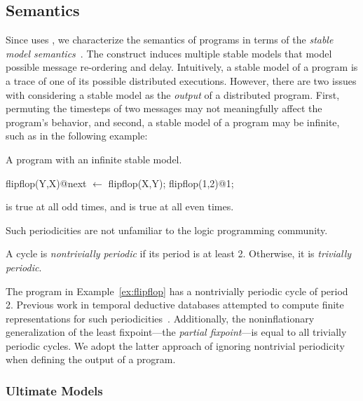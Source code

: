 
\subsection{Semantics}
Since \lang uses , we characterize the semantics of \lang programs in terms of the {\em stable model semantics}~\cite{stable-model}.  The  construct induces multiple stable models that model possible message re-ordering and delay.  Intuitively, a stable model of a \lang program is a trace of one of its possible distributed executions.  However, there are two issues with considering a stable model as the {\em output} of a distributed program.  First, permuting the timesteps of two messages may not meaningfully affect the program's behavior, and second, a stable model of a \lang program may be infinite, such as in the following example:

\begin{example}
\label{ex:flipflop}
A \lang program with an infinite stable model.

\begin{Dedalus}
flipflop(Y,X)@next \(\leftarrow\) flipflop(X,Y);
flipflop(1,2)@1;
\end{Dedalus}

 is true at all odd times, and  is true at all even times.
\end{example}

Such periodicities are not unfamiliar to the logic programming community.  

\begin{definition}
A cycle is {\em nontrivially periodic} if its period is at least 2.  Otherwise, it is {\em trivially periodic}.
\end{definition}

The program in Example~\ref{ex:flipflop} has a nontrivially periodic cycle of period 2.  Previous work in temporal deductive databases attempted to compute finite representations for such periodicities~\cite{tdd-infinite}.  Additionally, the noninflationary generalization of the least fixpoint---the {\em partial fixpoint}---is equal to all trivially periodic cycles.  We adopt the latter approach of ignoring nontrivial periodicity when defining the output of a \lang program.

\subsubsection{Ultimate Models}

